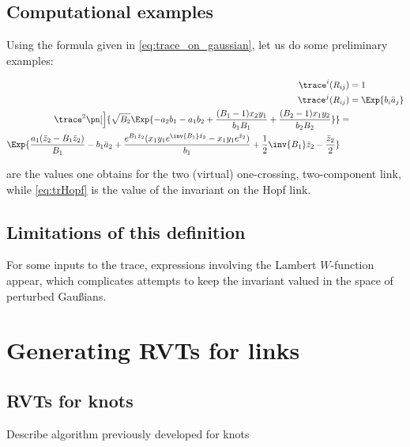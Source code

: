 \documentclass{article}
\begin{document}
\subsection{Computational examples}

Using the formula given in \cref{eq:trace_on_gaussian}, let us do some
preliminary examples:

\begin{align}
        \trace^i(R_{ij}) &= 1\label{eq:trR}\\
        \trace^j(R_{ij}) &= \Exp{b_i\ba_j}\label{eq:trR2}\\
        \begin{split}\label{eq:trHopf}
                \trace^2\pn[\Big]{\sqrt{B_2}\Exp{
                                -a_2 b_1-a_1 b_2 +
                                \frac{(B_1-1) x_2 y_1}{b_1 B_1}+
                        \frac{(B_2-1) x_1 y_2}{b_2 B_2}}
                } &= \\
                \Exp{
                        \frac{a_1 (\bz_2-B_1 \bz_2)}{B_1}-b_1 \ba_2+
                        \frac{e^{B_1 \bz_2}
                        (x_1 y_1 e^{\inv{B_1} \bz_2}-x_1 y_1 e^{\bz_2})}{b_1}+
                        \frac{1}{2} \inv{B_1} \bz_2-\frac{\bz_2}{2}
                }&%
        \end{split}
\end{align}

 are the values one obtains for the two (virtual)
one-crossing, two-component link, while \cref{eq:trHopf} is the value of the
invariant on the Hopf link.

\subsection{Limitations of this definition}
For some inputs to the trace, expressions involving the Lambert $W$-function
appear, which complicates attempts to keep the invariant valued in the space of
perturbed Gaußians.

\section{Generating \acp{RVT} for links}

\subsection{\acp{RVT} for knots}
Describe algorithm previously developed for knots
\end{document}
